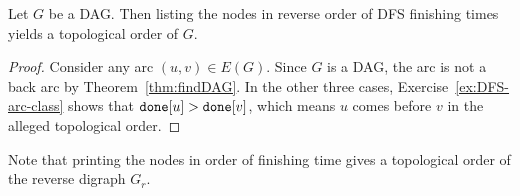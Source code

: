 \begin{Theorem}
Let $G$ be a DAG. Then listing the nodes in reverse order of DFS
finishing times yields a topological order of $G$.
\end{Theorem}
\begin{proof} 
Consider any arc $(u,v)\in E(G)$. Since $G$ is a DAG,
the arc is not a back arc by Theorem~\ref{thm:findDAG}. In the other three
cases, Exercise~\ref{ex:DFS-arc-class} shows that $\done[u] > \done[v]$,
which means $u$ comes before $v$ in the alleged topological order.
\end{proof}

Note that printing the nodes in order of
finishing time gives a topological order of the reverse digraph $G_r$.

%
%
%
%
%
%
%
%
%
%

